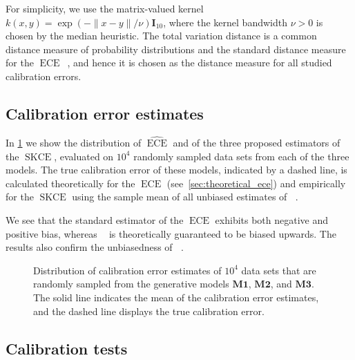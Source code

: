 \documentclass{article}
\DeclareMathOperator{\ECE}{ECE}
\DeclareMathOperator{\squaredkernelmeasure}{SKCE}
\DeclareMathOperator{\biasedestimator}{\widehat{SKCE}_b}
\DeclareMathOperator{\unbiasedestimator}{\widehat{SKCE}_{uq}}
\DeclareMathOperator{\linearestimator}{\widehat{SKCE}_{ul}}
\begin{document}
For simplicity, we use the matrix-valued kernel
$k(x, y) = \exp{(- \|x - y\| / \nu)} \mathbf{I}_{10}$, where the kernel bandwidth
$\nu > 0$ is chosen by the median heuristic. The total variation distance is a
common distance measure of probability distributions and the standard distance
measure for the
$\ECE$~\citep{guo17_calib_moder_neural_networ,vaicenavicius19_evaluat,broecker07_increas_reliab_reliab_diagr},
and hence it is chosen as the distance measure for all studied calibration
errors.

\subsection{Calibration error estimates}

In \cref{fig:errors_comparison} we show the distribution of $\widehat{\ECE}$ and
of the three proposed estimators of the $\squaredkernelmeasure$, evaluated on
$10^4$ randomly sampled data sets from each of the three models. The true
calibration error of these models, indicated by a dashed line, is calculated
theoretically for the $\ECE$ (see~\cref{sec:theoretical_ece}) and empirically
for the $\squaredkernelmeasure$ using the sample mean of all unbiased estimates
of $\unbiasedestimator$.

We see that the standard estimator of the $\ECE$ exhibits both negative and
positive bias, whereas $\biasedestimator$ is theoretically guaranteed to be
biased upwards. The results also confirm the unbiasedness of $\linearestimator$.

\begin{figure}[!htbp]
  \begin{center}
    
    \caption{Distribution of calibration error estimates of $10^4$ data sets
      that are randomly sampled from the generative models $\mathbf{M1}$,
      $\mathbf{M2}$, and $\mathbf{M3}$. The solid line indicates the mean of the
      calibration error estimates, and the dashed line displays the true
      calibration error.}
    \label{fig:errors_comparison}
  \end{center}
\end{figure}

\subsection{Calibration tests}
\end{document}
